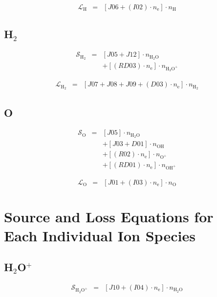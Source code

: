 \documentclass[12pt, letterpaper]{article}
\begin{document}
\begin{eqnarray}
\mathcal{L}_{\text{H}} & = & \left[ J06 + \left( I02 \right) \cdot n_{\text{e}} \right] \cdot n_{\text{H}}
\end{eqnarray}

\subsection{H$_{2}$}

\begin{eqnarray}
\mathcal{S}_{\text{H}_{2}} & = & \left[ J05 + J12 \right] \cdot n_{\text{H}_{2}\text{O}} \nonumber \\
&  & + \left[ \left( RD03 \right) \cdot n_{\text{e}} \right] \cdot n_{\text{H}_{3} \text{O}^{+}}
\end{eqnarray}

\begin{eqnarray}
\mathcal{L}_{\text{H}_{2}} & = & \left[ J07 + J08 + J09 + \left( D03 \right) \cdot n_{\text{e}} \right] \cdot n_{\text{H}_{2}}
\end{eqnarray}

\subsection{O}

\begin{eqnarray}
\mathcal{S}_{\text{O}} & = & \left[ J05 \right] \cdot n_{\text{H}_{2}\text{O}} \nonumber \\
&  & + \left[ J03 + D01 \right] \cdot n_{\text{OH}} \nonumber \\
&  & + \left[ \left( R02 \right) \cdot n_{\text{e}} \right] \cdot n_{\text{O}^{+}} \nonumber \\
&  & + \left[ \left( RD01 \right) \cdot n_{\text{e}} \right] \cdot n_{\text{OH}^{+}}
\end{eqnarray}

\begin{eqnarray}
\mathcal{L}_{\text{O}} & = & \left[ J01 + \left( I03 \right) \cdot n_{\text{e}} \right] \cdot n_{\text{O}}
\end{eqnarray}

\section{Source and Loss Equations for Each Individual Ion Species}
\subsection{H$_{2}$O$^{+}$}
\begin{eqnarray}
\mathcal{S}_{\text{H}_{2}\text{O}^{+}} & = & \left[ J10 + \left( I04\right) \cdot n_{\text{e}} \right] \cdot n_{\text{H}_{2}\text{O}}
\end{eqnarray}
\end{document}
